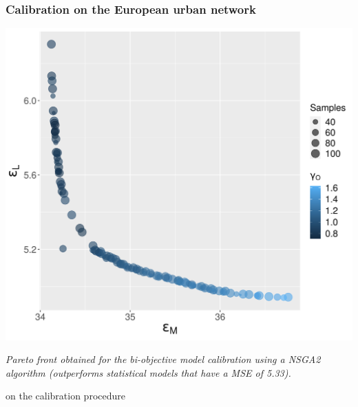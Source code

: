 \begin{frame}[label=calibmain]

\frametitle{Calibration on the European urban network}

    \begin{center}
    	\includegraphics[height=0.7\textheight]{../../figures/Fig8.png}
    	
    \end{center}
    
    \footnotesize
    
\textit{Pareto front obtained for the bi-objective model calibration using a NSGA2 algorithm (outperforms statistical models that have a MSE of 5.33).}

    
    
   \hyperlink{calibration}{} on the calibration procedure
    
    
    
    
\end{frame}


